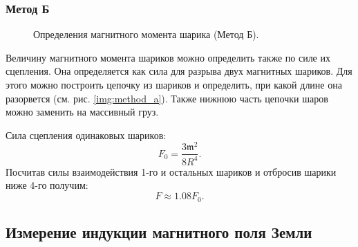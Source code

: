 \documentclass[12pt,a4paper]{article}
\newcommand{\figref}[1]{(см. рис. \ref{#1})}
\begin{document}
	\subsubsection*{Метод Б}

	\begin{figure}
		\vspace{-50pt}
		\caption{Определения магнитного момента шарика (Метод Б).}
		\label{img:method_b}
	\end{figure}
	Величину магнитного момен­та шариков можно определить также по си­ле их сцепления. Она определяется как сила для разрыва двух магнитных шариков. Для этого можно построить цепочку из шариков и определить, при какой длине она разорвется \figref{img:method_a}. Также нижнюю часть цепочки шаров можно заменить на массивный груз.
	
	Сила сцепления одинаковых шариков:
	$$ F_0 = \frac{3\mathfrak{m}^2}{8 R^4}. $$
	Посчитав силы взаимодействия 1-го и остальных шариков и отбросив шарики ниже 4-го получим:
	$$ F \approx 1.08 F_0. $$
	
	\subsection*{Измерение индукции магнитного поля Земли}
	
\end{document}
